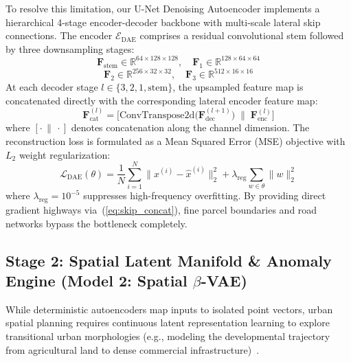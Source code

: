 \documentclass[journal]{IEEEtran}
\begin{document}
To resolve this limitation, our U-Net Denoising Autoencoder implements a hierarchical 4-stage encoder-decoder backbone with multi-scale lateral skip connections. The encoder $\mathcal{E}_{\text{DAE}}$ comprises a residual convolutional stem followed by three downsampling stages:
\begin{equation}
\mathbf{F}_{\text{stem}} \in \mathbb{R}^{64 \times 128 \times 128}, \quad \mathbf{F}_1 \in \mathbb{R}^{128 \times 64 \times 64}
\end{equation}
\begin{equation}
\mathbf{F}_2 \in \mathbb{R}^{256 \times 32 \times 32}, \quad \mathbf{F}_3 \in \mathbb{R}^{512 \times 16 \times 16}
\end{equation}
At each decoder stage $l \in \{3, 2, 1, \text{stem}\}$, the upsampled feature map is concatenated directly with the corresponding lateral encoder feature map:
\begin{equation}
\mathbf{F}_{\text{cat}}^{(l)} = \Big[\text{ConvTranspose2d}\big(\mathbf{F}_{\text{dec}}^{(l+1)}\big) \;\Big\|\; \mathbf{F}_{\text{enc}}^{(l)}\Big]
\label{eq:skip_concat}
\end{equation}
where $[\cdot \,\|\, \cdot]$ denotes concatenation along the channel dimension. The reconstruction loss is formulated as a Mean Squared Error (MSE) objective with $L_2$ weight regularization:
\begin{equation}
\mathcal{L}_{\text{DAE}}(\theta) = \frac{1}{N} \sum_{i=1}^N \|x^{(i)} - \hat{x}^{(i)}\|_2^2 + \lambda_{\text{reg}} \sum_{w \in \theta} \|w\|_2^2
\label{eq:dae_loss}
\end{equation}
where $\lambda_{\text{reg}} = 10^{-5}$ suppresses high-frequency overfitting. By providing direct gradient highways via~(\ref{eq:skip_concat}), fine parcel boundaries and road networks bypass the bottleneck completely.

\subsection{Stage 2: Spatial Latent Manifold & Anomaly Engine (Model 2: Spatial $\beta$-VAE)}
While deterministic autoencoders map inputs to isolated point vectors, urban spatial planning requires continuous latent representation learning to explore transitional urban morphologies (e.g., modeling the developmental trajectory from agricultural land to dense commercial infrastructure)~\cite{kingma2013auto,higgins2017beta}.
\end{document}
